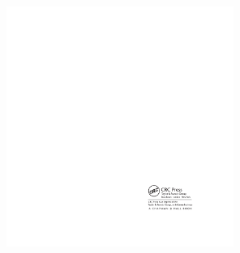 \begin{center}
    \vspace*{8em}
    \includegraphics[width=20em]{./pics/Logo_II.pdf}
\end{center}
\vspace*{\fill}
\newpage

